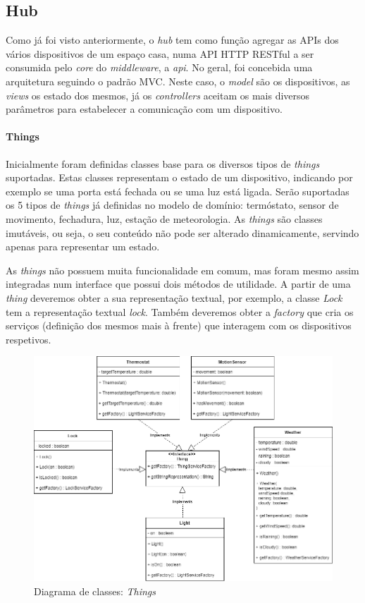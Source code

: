 
\subsection{Hub}

Como já foi visto anteriormente, o \textit{hub} tem como função agregar as APIs dos vários dispositivos de um espaço casa, numa API HTTP RESTful a ser consumida pelo \textit{core} do \textit{middleware}, a \textit{api}. No geral, foi concebida uma arquitetura seguindo o padrão MVC. Neste caso, o \textit{model} são os dispositivos, as \textit{views} os estado dos mesmos, já os \textit{controllers} aceitam os mais diversos parâmetros para estabelecer a comunicação com um dispositivo.

%
%
%
%

\paragraph*{Things}

Inicialmente foram definidas classes base para os diversos tipos de \textit{things} suportadas. Estas classes representam o estado de um dispositivo, indicando por exemplo se uma porta está fechada ou se uma luz está ligada. Serão suportadas os 5 tipos de \textit{things} já definidas no modelo de domínio: termóstato, sensor de movimento, fechadura, luz, estação de meteorologia. As \textit{things} são classes imutáveis, ou seja, o seu conteúdo não pode ser alterado dinamicamente, servindo apenas para representar um estado.

As \textit{things} não possuem muita funcionalidade em comum, mas foram mesmo assim integradas num interface que possui dois métodos de utilidade. A partir de uma \textit{thing} deveremos obter a sua representação textual, por exemplo, a classe \textit{Lock} tem a representação textual \textit{lock}. Também deveremos obter a \textit{factory} que cria os serviços (definição dos mesmos mais à frente) que interagem com os dispositivos respetivos.

\begin{figure}[H]
  \centering
        \includegraphics[scale=0.55]{img/hub-things.png}
  \caption{Diagrama de classes: \textit{Things}}
  \label{fig:things-hub}
\end{figure}

